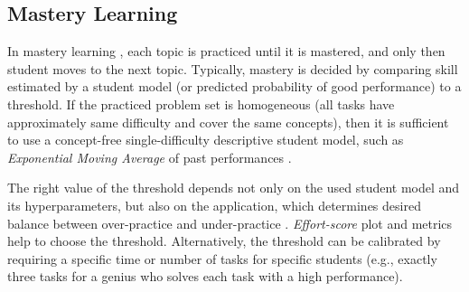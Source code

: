 \subsection{Mastery Learning}
\label{sec:mastery-learning}

In mastery learning \cite{mastery-learning-scale}, each topic
is practiced until it is mastered, and only then student moves
to the next topic.  %
Typically, mastery is decided by comparing skill estimated by a student model
(or predicted probability of good performance) to a threshold. %
If the practiced problem set is homogeneous (all tasks have approximately same difficulty
and cover the same concepts), then it is sufficient to use a concept-free
single-difficulty descriptive student model,  %
such as \emph{Exponential Moving Average} of past performances
\cite{alg.mastery}.

The right value of the threshold depends not only on the used student model and
its hyperparameters, but also on the application, which determines desired
balance between over-practice and under-practice
\cite{mastery-overpractice-underpractice-tradeoff, mastery-evaluation-model}.
\emph{Effort-score} plot and metrics
\cite{alg.mastery, evaluation-leopard, learner-models-integration-skills} %
help to choose the threshold.
Alternatively, the threshold can be calibrated by requiring a specific time or
number of tasks for specific students (e.g., exactly three tasks for a genius who
solves each task with a high performance). %


